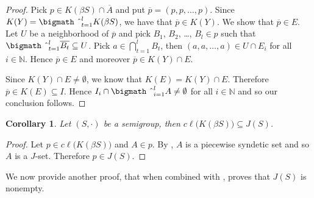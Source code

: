 \documentclass[12pt,showtrims]{memoir}
\theoremstyle{plain}
\newtheorem{cor}[thm]{Corollary}
\theoremstyle{definition}
\newcommand{\bbN}{\mathbb{N}}
\newcommand{\bigtimes}{\hbox{\bigmath \char'2}}
\begin{document}
\begin{proof}
  Pick $p \in K(\beta S) \cap \overline{A}$ and put $\overline{p} = (p, p, \ldots, p)$. 
  Since $K(Y) = \bigtimes_{t=1}^l K(\beta S)$, we have that $\overline{p} \in K(Y)$. 
  We show that $\overline{p} \in E$.
  Let $U$ be a neighborhood of $\overline{p}$ and pick $B_1$, $B_2$, \dots, $B_l \in p$ such that $\bigtimes_{t=1}^l \overline{B_t} \subseteq U$. 
  Pick $a \in \bigcap_{t=1}^l B_t$, then $(a, a, \ldots, a) \in U \cap E_i$ for all $i \in \bbN$. 
  Hence $\overline{p} \in E$ and moreover $\overline{p} \in K(Y) \cap E$.

  Since $K(Y) \cap E \ne \emptyset$, we know that $K(E) = K(Y) \cap E$.
  Therefore $\overline{p} \in K(E) \subseteq I$.
  Hence $I_i \cap \bigtimes_{i=1}^l A \ne \emptyset$ for all $i \in \bbN$ and so our conclusion follows.
\end{proof}

\begin{cor}
  Let $(S, \cdot)$ be a semigroup, then $c\ell\bigl( K(\beta S) \bigr) \subseteq J(S)$.
\end{cor}
\begin{proof}
  Let $p \in c\ell\bigl( K(\beta S) \bigr)$ and $A \in p$.
  By \cite[Corollary 4.41]{Hindman:1998fk}, $A$ is a piecewise syndetic set and so $A$ is a $J$-set.
  Therefore $p \in J(S)$.
\end{proof}

We now provide another proof, that when combined with \cite[Theorem 3.11]{Hindman:1998fk}, proves that $J(S)$ is nonempty.
\end{document}
